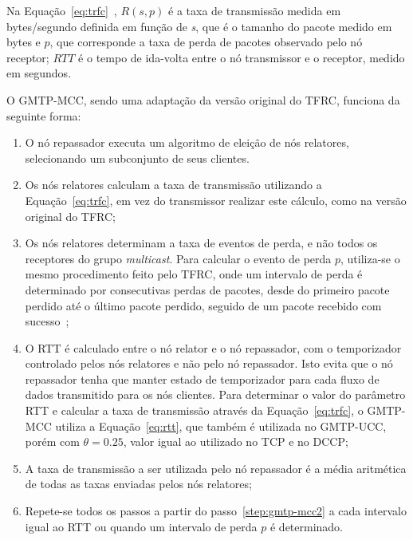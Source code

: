 Na Equação~\ref{eq:trfc}~\cite{Padhye98model}, $R(s,p)$ é a taxa de transmissão medida em bytes/segundo definida em função de \textit{s}, que é o tamanho do pacote medido em bytes e $p$, que corresponde a taxa de perda de pacotes observado pelo nó receptor; $RTT$ é o tempo de ida-volta entre o nó transmissor e o receptor, medido em segundos.

O GMTP-MCC, sendo uma adaptação da versão original do TFRC, funciona da seguinte forma:

\begin{enumerate}

  \item O nó repassador executa um algoritmo de eleição de nós relatores, selecionando um subconjunto de seus clientes.

  \item Os nós relatores calculam a taxa de transmissão utilizando a Equação~\ref{eq:trfc}, em vez do transmissor realizar este cálculo, como na versão original do TFRC;
  \label{step:gmtp-mcc2}

  \item Os nós relatores determinam a taxa de eventos de perda, e não todos os receptores do grupo \textit{multicast}. Para calcular o evento de perda $p$, utiliza-se o mesmo procedimento feito pelo TFRC, onde um intervalo de perda é determinado por consecutivas perdas de pacotes, desde do primeiro pacote perdido até o último pacote perdido, seguido de um pacote recebido com sucesso~\cite{RFC3448,Padhye98model};

  \item O RTT é calculado entre o nó relator e o nó repassador, com o temporizador controlado pelos nós relatores e não pelo nó repassador. Isto evita que o nó repassador tenha que manter estado de temporizador para cada fluxo de dados transmitido para os nós clientes. Para determinar o valor do parâmetro RTT e calcular a taxa de transmissão através da Equação~\ref{eq:trfc}, o GMTP-MCC utiliza a Equação~\ref{eq:rtt}, que também é utilizada no GMTP-UCC, porém com $\theta = 0.25$, valor igual ao utilizado no TCP e no DCCP;

  \item A taxa de transmissão a ser utilizada pelo nó repassador é a média aritmética de todas as taxas enviadas pelos nós relatores;

  \item Repete-se todos os passos a partir do passo~\ref{step:gmtp-mcc2} a cada intervalo igual ao RTT ou quando um intervalo de perda $p$ é determinado.
\end{enumerate}

